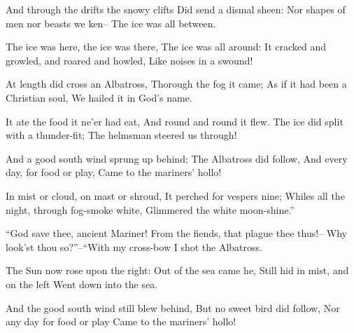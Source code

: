 \documentclass{book}
\begin{document}
  And through the drifts the snowy clifts                             
  Did send a dismal sheen:
  Nor shapes of men nor beasts we ken--
  The ice was all between.

  The ice was here, the ice was there,
  The ice was all around:                                             
  It cracked and growled, and roared and howled,
  Like noises in a swound!


%
  At length did cross an Albatross,
  Thorough the fog it came;
  As if it had been a Christian soul,                                 
  We hailed it in God's name.

  It ate the food it ne'er had eat,
  And round and round it flew.
  The ice did split with a thunder-fit;
  The helmsman steered us through!                                    

%

  And a good south wind sprung up behind;
  The Albatross did follow,
  And every day, for food or play,
  Came to the mariners' hollo!

  In mist or cloud, on mast or shroud,                                
  It perched for vespers nine;
  Whiles all the night, through fog-smoke white,
  Glimmered the white moon-shine.''

%
  ``God save thee, ancient Mariner!
  From the fiends, that plague thee thus!--                           
  Why look'st thou so?''--``With my cross-bow
  I shot the Albatross.


\Part

  The Sun now rose upon the right:
  Out of the sea came he,
  Still hid in mist, and on the left                                  
  Went down into the sea.

  And the good south wind still blew behind,
  But no sweet bird did follow,
  Nor any day for food or play
  Came to the mariners' hollo!                                        
\end{document}
